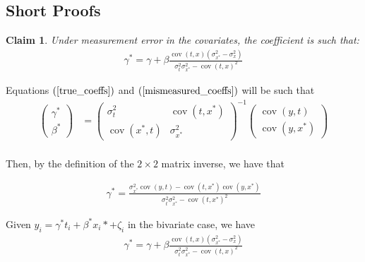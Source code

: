 \documentclass[10pt]{article}
\makeatletter
\newtheorem{claim}{Claim}
\renewenvironment{proof}[1][\proofname] {\par\pushQED{\qed}\normalfont\topsep6\p@\@plus6\p@\relax\trivlist\item[\hskip\labelsep\bfseries#1\@addpunct{.}]\ignorespaces}{\popQED\endtrivlist\@endpefalse}
\makeatother
\begin{document}
	\subsection*{Short Proofs}

        \setcounter{claim}{0}
        \setcounter{claimproof}{0}

            \begin{claim} \label{claim_one_with_proof}
            Under measurement error in the covariates, the coefficient is such that:
            \begin{align*}
                    \gamma^* = \gamma + \beta\frac{\operatorname{cov}(t,x)(\sigma^2_{x^*}-\sigma^2_x)}{\sigma_{t}^2\sigma_{x^*}^2-\operatorname{cov}({t,x})^2}
                \end{align*}
            \end{claim}
            
        \begin{proof}

        Equations $(\ref{true_coeffs})$ and $(\ref{mismeasured_coeffs})$ will be such that
        \begin{align*}
                \left(\begin{array}{l}
            {\gamma}^* \\
            {\beta}^*
            \end{array}\right)&=\left(\begin{array}{cc}
            {\sigma}^2_{t} & \operatorname{cov}({t,x^*}) \\
            \operatorname{cov}({x^*,t}) & {\sigma}_{x^*}^2
            \end{array}\right)^{-1}\left(\begin{array}{c}
            \operatorname{cov}{(y,t)} \\
            \operatorname{cov}{(y,x^*)}
            \end{array}\right) \\
        \end{align*}
                
        Then, by the definition of the $2 \times 2$ matrix inverse, we have that

        \begin{align*}
            {\gamma}^* =\frac{\sigma_{x^*}^2\operatorname{cov}{(y,t)}-\operatorname{cov}({t,x^*})\operatorname{cov}{(y,x^*)}}{\sigma_{t}^2\sigma_{x^*}^2-\operatorname{cov}({t,x^*})^2}
        \end{align*}

        Given $y_i = \gamma^* t_i +  \beta^*x_i* + \zeta_i$ in the bivariate case, we have
\begin{align*}
    \gamma^* = \gamma + \beta\frac{\operatorname{cov}(t,x)(\sigma^2_{x^*}-\sigma^2_x)}{\sigma_{t}^2\sigma_{x^*}^2-\operatorname{cov}({t,x})^2}
\end{align*}

        \end{proof}	
        
\end{document}

